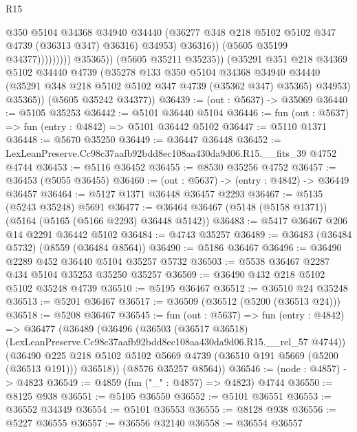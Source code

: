 \begin{lexlean}{R15}
\begin{coremodule}
{{{{{{{{{{{                                    @350
                                    @5104
                                    @34368
                                    @34940
                                    @34440
                                    (@36277 @348 @218 @5102 @5102 @347 @4739 (@36313 @347) @36316)
                                    @34953)
                                  @36316))
                              (@5605 @35199 @34377)))))))))
              @35365))
          (@5605 @35211 @35235))
        (@35291
          @351
          @218
          @34369
          @5102
          @34440
          @4739
          (@35278
            @133
            @350
            @5104
            @34368
            @34940
            @34440
            (@35291 @348 @218 @5102 @5102 @347 @4739 (@35362 @347) @35365)
            @34953)
          @35365))
      (@5605 @35242 @34377))
@36439 := (out : @5637) -> @35069
@36440 := @5105 @35253
@36442 := @5101 @36440 @5104
@36446 := fun (out : @5637) => fun (entry : @4842) => @5101 @36442 @5102
@36447 := @5110 @1371
@36448 := @5670 @35250
@36449 := @36447 @36448
@36452 := LexLeanPreserve.Cc98c37aafb92bdd8ec108aa430da9d06.R15.__fits_39 @4752 @4744
@36453 := @5116 @36452
@36455 := @8530 @35256 @4752
@36457 := @36453 (@5055 @36455)
@36460 := (out : @5637) -> (entry : @4842) -> @36449 @36457
@36464 := @5127 @1371 @36448 @36457 @2293
@36467 := @5135 (@5243 @35248) @5691
@36477 := @36464 @36467 (@5148 (@5158 @1371)) (@5164 (@5165 (@5166 @2293) @36448 @5142))
@36483 := @5417 @36467 @206 @14 @2291 @36442 @5102
@36484 := @4743 @35257
@36489 := @36483 (@36484 @5732) (@8559 (@36484 @8564))
@36490 := @5186 @36467
@36496 := @36490 @2289 @452 @36440 @5104 @35257 @5732
@36503 := @5538 @36467 @2287 @434 @5104 @35253 @35250 @35257
@36509 := @36490 @432 @218 @5102 @5102 @35248 @4739
@36510 := @5195 @36467
@36512 := @36510 @24 @35248
@36513 := @5201 @36467
@36517 := @36509 (@36512 (@5200 (@36513 @24)))
@36518 := @5208 @36467
@36545 := fun (out : @5637) =>
  fun (entry : @4842) =>
  @36477
    (@36489
      (@36496
        (@36503
          (@36517 @36518)
          (LexLeanPreserve.Cc98c37aafb92bdd8ec108aa430da9d06.R15.__rel_57 @4744))
        (@36490 @225 @218 @5102 @5102 @5669 @4739 (@36510 @191 @5669 (@5200 (@36513 @191))) @36518))
      (@8576 @35257 @8564))
@36546 := (node : @4857) -> @4823
@36549 := @4859 (fun ("_" : @4857) => @4823) @4744
@36550 := @8125 @938
@36551 := @5105 @36550
@36552 := @5101 @36551
@36553 := @36552 @34349
@36554 := @5101 @36553
@36555 := @8128 @938
@36556 := @5227 @36555
@36557 := @36556 @32140
@36558 := @36554 @36557
}}}}}}}}}}}
\end{coremodule}
\end{lexlean}
